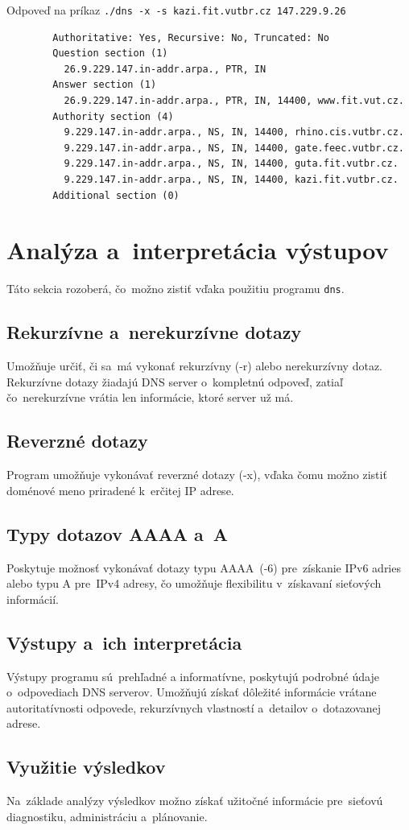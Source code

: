 \documentclass[a4paper, 11pt]{article}
\begin{document}
	\noindent Odpoveď na príkaz \texttt{./dns -x -s kazi.fit.vutbr.cz 147.229.9.26}
	\begin{verbatim}
		Authoritative: Yes, Recursive: No, Truncated: No
		Question section (1)
		  26.9.229.147.in-addr.arpa., PTR, IN
		Answer section (1)
		  26.9.229.147.in-addr.arpa., PTR, IN, 14400, www.fit.vut.cz.
		Authority section (4)
		  9.229.147.in-addr.arpa., NS, IN, 14400, rhino.cis.vutbr.cz.
		  9.229.147.in-addr.arpa., NS, IN, 14400, gate.feec.vutbr.cz.
		  9.229.147.in-addr.arpa., NS, IN, 14400, guta.fit.vutbr.cz.
		  9.229.147.in-addr.arpa., NS, IN, 14400, kazi.fit.vutbr.cz.
		Additional section (0)
	\end{verbatim}
	
	\section{Analýza a~interpretácia výstupov}
	Táto sekcia rozoberá, čo~možno zistiť vďaka použitiu programu \texttt{dns}.
	\subsection{Rekurzívne a~nerekurzívne dotazy}
	Umožňuje určiť, či sa~má vykonať rekurzívny (-r) alebo nerekurzívny dotaz. Rekurzívne dotazy žiadajú DNS server o~kompletnú odpoveď, zatiaľ čo~nerekurzívne vrátia len informácie, ktoré server už má.
	\subsection{Reverzné dotazy}
	Program umožňuje vykonávať reverzné dotazy (-x), vďaka čomu možno zistiť doménové meno priradené k~erčitej IP adrese.
	\subsection{Typy dotazov AAAA a~A}
	Poskytuje možnosť vykonávať dotazy typu AAAA~(-6) pre~získanie IPv6 adries alebo typu A pre~IPv4 adresy, čo umožňuje flexibilitu v~získavaní sieťových informácií.
	\subsection{Výstupy a~ich interpretácia}
	Výstupy programu sú~prehľadné a informatívne, poskytujú podrobné údaje o~odpovediach DNS serverov. Umožňujú získať dôležité informácie vrátane autoritatívnosti odpovede, rekurzívnych vlastností a~detailov o~dotazovanej adrese.
	\subsection{Využitie výsledkov}
	Na~základe analýzy výsledkov možno získať užitočné informácie pre~sieťovú diagnostiku, administráciu a~plánovanie.
\end{document}
